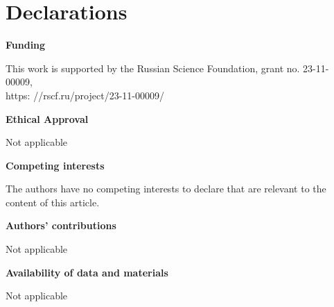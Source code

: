 \documentclass[10pt, a4paper]{article}
\theoremstyle{plain}
\theoremstyle{definition}
\numberwithin{equation}{section}
\begin{document}
\section*{Declarations}

\textbf{Funding}

This work is supported by the Russian Science
Foundation, grant no. 23-11-00009,\\ https: //rscf.ru/project/23-11-00009/

\textbf{Ethical Approval}

Not applicable

\textbf{Competing interests}

The authors have no competing interests to declare that are relevant to the
content of this article.

\textbf{Authors' contributions}

Not applicable

\textbf{Availability of data and materials}

Not applicable
\end{document}

